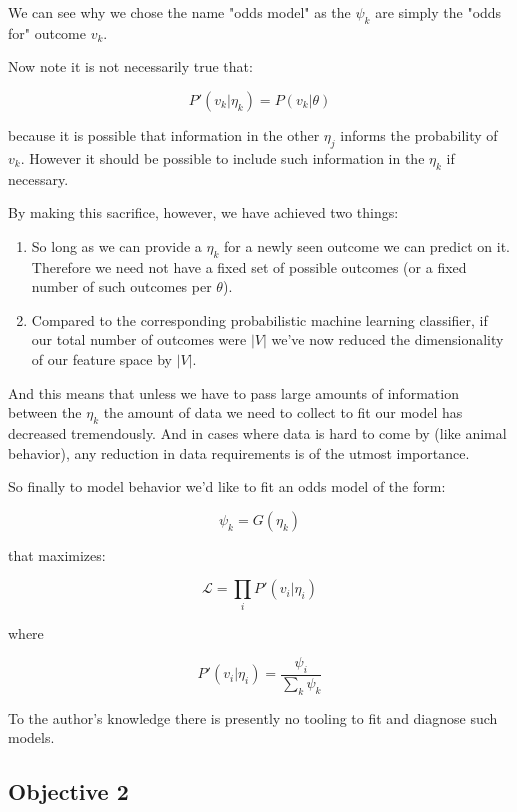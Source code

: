 \documentclass[11pt]{article}
\begin{document}
We can see why we chose the name "odds model" as the $\psi_k$ are simply the "odds for" outcome $v_k$. \newline

Now note it is not necessarily true that:

$$P'(v_k|\eta_k) = P(v_k|\theta)$$

because it is possible that information in the other $\eta_j$ informs the probability of $v_k$. However it should be possible to include such information in the $\eta_k$ if necessary. 

By making this sacrifice, however, we have achieved two things:

\begin{enumerate}
\item So long as we can provide a $\eta_k$ for a newly seen outcome we can predict on it. Therefore we need not have a fixed set of possible outcomes (or a fixed number of such outcomes per $\theta$).
\item Compared to the corresponding probabilistic machine learning classifier, if our total number of outcomes were $|V|$ we've now reduced the dimensionality of our feature space by $|V|$. 
\end{enumerate}

And this means that unless we have to pass large amounts of information between the $\eta_k$ the amount of data we need to collect to fit our model has decreased tremendously. And in cases where data is hard to come by (like animal behavior), any reduction in data requirements is of the utmost importance. 

So finally to model behavior we'd like to fit an odds model of the form:

$$\psi_k = G(\eta_k)$$

that maximizes:

$$\mathcal{L}=\prod_i P'(v_i | \eta_i)$$

where 

$$P'(v_i|\eta_i) = \frac{\psi_i}{\sum_k \psi_k}$$\newline

To the author's knowledge there is presently no tooling to fit and diagnose such models. 







\subsection{Objective 2}
\end{document}
